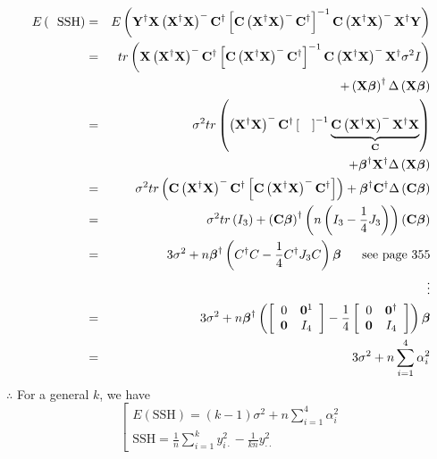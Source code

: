 \documentclass{article}
\begin{document}
\begin{eqnarray*}
E\left( \text{SSH}\right)  &=&E\left( \mathbf{Y}^{\dagger }\mathbf{X}\left( 
\mathbf{X}^{\dagger }\mathbf{X}\right) ^{-}\mathbf{C}^{\dagger }\left[ 
\mathbf{C}\left( \mathbf{X}^{\dagger }\mathbf{X}\right) ^{-}\mathbf{C}%
^{\dagger }\right] ^{-1}\mathbf{C}\left( \mathbf{X}^{\dagger }\mathbf{X}%
\right) ^{-}\mathbf{X}^{\dagger }\mathbf{Y}\right)  \\
&=&tr\left( \mathbf{X}\left( \mathbf{X}^{\dagger }\mathbf{X}\right) ^{-}%
\mathbf{C}^{\dagger }\left[ \mathbf{C}\left( \mathbf{X}^{\dagger }\mathbf{X}%
\right) ^{-}\mathbf{C}^{\dagger }\right] ^{-1}\mathbf{C}\left( \mathbf{X}%
^{\dagger }\mathbf{X}\right) ^{-}\mathbf{X}^{\dagger }\sigma ^{2}I\right)  \\
&&+\left( \mathbf{X\beta }\right) ^{\dagger }\Delta \left( \mathbf{X\beta }%
\right)  \\
&=&\sigma ^{2}tr\left( \left( \mathbf{X}^{\dagger }\mathbf{X}\right) ^{-}%
\mathbf{C}^{\dagger }\left[ \mathbf{\quad }\right] ^{-1}\underset{\mathbf{C}}%
{\underbrace{\mathbf{C}\left( \mathbf{X}^{\dagger }\mathbf{X}\right) ^{-}%
\mathbf{X}^{\dagger }\mathbf{X}}}\right)  \\
&&+\mathbf{\beta }^{\dagger }\mathbf{X^{\dagger }}\Delta \left( \mathbf{%
X\beta }\right)  \\
&=&\sigma ^{2}tr\left( \mathbf{C}\left( \mathbf{X}^{\dagger }\mathbf{X}%
\right) ^{-}\mathbf{C}^{\dagger }\left[ \mathbf{C}\left( \mathbf{X}^{\dagger
}\mathbf{X}\right) ^{-}\mathbf{C}^{\dagger }\right] \right) +\mathbf{\beta }%
^{\dagger }\mathbf{C^{\dagger }}\Delta \left( \mathbf{C\beta }\right)  \\
&=&\sigma ^{2}tr\left( I_{3}\right) +\left( \mathbf{C\beta }\right)
^{\dagger }\left( n\left( I_{3}-\frac{1}{4}J_{3}\right) \right) \left( 
\mathbf{C\beta }\right)  \\
&=&3\sigma ^{2}+n\mathbf{\beta }^{\dagger }\left( C^{\dagger }C-\frac{1}{4}%
C^{\dagger }J_{3}C\right) \mathbf{\beta \quad }\text{see page 355} \\
&&\vdots  \\
&=&3\sigma ^{2}+n\mathbf{\beta }^{\dagger }\left( \left[ 
\begin{array}{cc}
0 & \mathbf{0}^{1} \\ 
\mathbf{0} & I_{4}%
\end{array}%
\right] -\frac{1}{4}\left[ 
\begin{array}{cc}
0 & \mathbf{0}^{\dagger } \\ 
\mathbf{0} & I_{4}%
\end{array}%
\right] \right) \mathbf{\beta } \\
&=&3\sigma ^{2}+n\sum\limits_{i=1}^{4}\alpha _{i}^{2}
\end{eqnarray*}%
$\therefore $ For a general $k$, we have%
\begin{equation*}
\left[ 
\begin{array}{c}
E\left( \text{SSH}\right) =\left( k-1\right) \sigma
^{2}+n\sum\limits_{i=1}^{4}\alpha _{i}^{2} \\ 
\text{SSH}=\frac{1}{n}\sum\limits_{i=1}^{k}y_{i\cdot }^{2}-\frac{1}{kn}%
y_{\cdot \cdot }^{2}%
\end{array}%
\right. 
\end{equation*}
\end{document}
